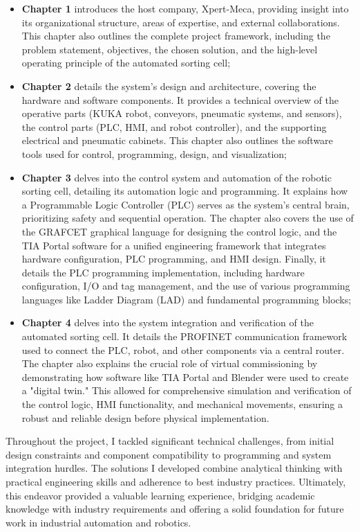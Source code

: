 \begin{itemize}
\item \textbf{Chapter 1} introduces the host company, Xpert-Meca, providing insight into its organizational structure, areas of expertise, and external collaborations. This chapter also outlines the complete project framework, including the problem statement, objectives, the chosen solution, and the high-level operating principle of the automated sorting cell;
\item \textbf{Chapter 2} details the system's design and architecture, covering the hardware and software components. It provides a technical overview of the operative parts (KUKA robot, conveyors, pneumatic systems, and sensors), the control parts (PLC, HMI, and robot controller), and the supporting electrical and pneumatic cabinets. This chapter also outlines the software tools used for control, programming, design, and visualization;
\item \textbf{Chapter 3} delves into the control system and automation of the robotic sorting cell, detailing its automation logic and programming. It explains how a Programmable Logic Controller (PLC) serves as the system's central brain, prioritizing safety and sequential operation. The chapter also covers the use of the GRAFCET graphical language for designing the control logic, and the TIA Portal software for a unified engineering framework that integrates hardware configuration, PLC programming, and HMI design. Finally, it details the PLC programming implementation, including hardware configuration, I/O and tag management, and the use of various programming languages like Ladder Diagram (LAD) and fundamental programming blocks;
\item \textbf{Chapter 4}  delves into the system integration and verification of the automated sorting cell. It details the PROFINET communication framework used to connect the PLC, robot, and other components via a central router. The chapter also explains the crucial role of virtual commissioning by demonstrating how software like TIA Portal and Blender were used to create a "digital twin." This allowed for comprehensive simulation and verification of the control logic, HMI functionality, and mechanical movements, ensuring a robust and reliable design before physical implementation.

\end{itemize}

Throughout the project, I tackled significant technical challenges, from initial design constraints and component compatibility to programming and system integration hurdles. The solutions I developed combine analytical thinking with practical engineering skills and adherence to best industry practices. Ultimately, this endeavor provided a valuable learning experience, bridging academic knowledge with industry requirements and offering a solid foundation for future work in industrial automation and robotics.